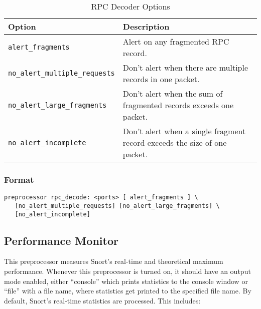\documentclass[english]{report}
\begin{document}
\begin{table}[!hbpt]

\caption{RPC Decoder Options\label{rpc options}}

\begin{center}\begin{tabular}{| l | l |}
\hline 
\textbf{Option}&
\textbf{Description}\\
\hline
\hline 
\texttt{alert\_fragments}&
Alert on any fragmented RPC record.\\
\hline 
\texttt{no\_alert\_multiple\_requests}&
Don't alert when there are multiple records in one packet.\\
\hline 
\texttt{no\_alert\_large\_fragments}&
Don't alert when the sum of fragmented records exceeds one packet.\\
\hline 
\texttt{no\_alert\_incomplete}&
Don't alert when a single fragment record exceeds the size of one
packet.\\
\hline
\end{tabular}\end{center}
\end{table}

\subsubsection{Format}

\begin{verbatim}
preprocessor rpc_decode: <ports> [ alert_fragments ] \
   [no_alert_multiple_requests] [no_alert_large_fragments] \
   [no_alert_incomplete]
\end{verbatim}

\subsection{Performance Monitor\label{sub:perfmonitor}}

This preprocessor measures Snort's real-time and theoretical maximum
performance.  Whenever this preprocessor is turned on, it should have an output
mode enabled, either ``console'' which prints statistics to the console window or
``file'' with a file name, where statistics get printed to the specified file
name. By default, Snort's real-time statistics are processed. This includes:
\end{document}
